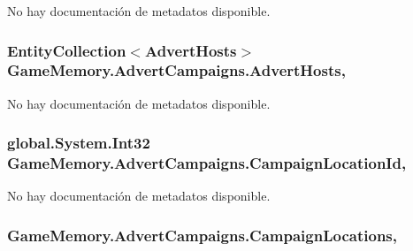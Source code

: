No hay documentación de metadatos disponible. 

\hypertarget{class_game_memory_1_1_advert_campaigns_a448c21e840bad8b62dbda780cb093f0e}{
\subsubsection[{Advert\-Hosts}]{\setlength{\rightskip}{0pt plus 5cm}Entity\-Collection$<${\bf Advert\-Hosts}$>$ Game\-Memory.\-Advert\-Campaigns.\-Advert\-Hosts\hspace{0.3cm}{\ttfamily [get]}, {\ttfamily [set]}}}\label{class_game_memory_1_1_advert_campaigns_a448c21e840bad8b62dbda780cb093f0e}


No hay documentación de metadatos disponible. 

\hypertarget{class_game_memory_1_1_advert_campaigns_ab079c6a8af8543da827b0ddee5ff574b}{
\subsubsection[{Campaign\-Location\-Id}]{\setlength{\rightskip}{0pt plus 5cm}global.\-System.\-Int32 Game\-Memory.\-Advert\-Campaigns.\-Campaign\-Location\-Id\hspace{0.3cm}{\ttfamily [get]}, {\ttfamily [set]}}}\label{class_game_memory_1_1_advert_campaigns_ab079c6a8af8543da827b0ddee5ff574b}


No hay documentación de metadatos disponible. 

\hypertarget{class_game_memory_1_1_advert_campaigns_ab28b02102aeef1788ca6e1dd3bb6a098}{
\subsubsection[{Campaign\-Locations}]{ Game\-Memory.\-Advert\-Campaigns.\-Campaign\-Locations\hspace{0.3cm}{\ttfamily [get]}, {\ttfamily [set]}}}\label{class_game_memory_1_1_advert_campaigns_ab28b02102aeef1788ca6e1dd3bb6a098}


